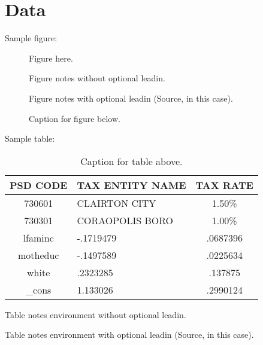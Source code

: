 \section{Data}
\label{sec:data}

Sample figure:

\begin{figure}
Figure here.

\caption{Caption for figure below.}
\begin{figurenotes}
Figure notes without optional leadin.
\end{figurenotes}
\begin{figurenotes}[Source]
Figure notes with optional leadin (Source, in this case).
\end{figurenotes}
\end{figure}

Sample table:

\begin{table}[t]
  \caption{Caption for table above.}

  \begin{tabular}{| c | l | c |}
    \hline
    \textbf{PSD CODE} & \textbf{TAX ENTITY NAME} & \textbf{TAX RATE} \\
    \hline
    730601 & CLAIRTON CITY & 1.50\% \\
    \hline
    730301 & CORAOPOLIS BORO & 1.00\% \\
    \hline
    lfaminc  & -.1719479 & .0687396 \\\hline
    motheduc & -.1497589 & .0225634 \\\hline
    white    & .2323285  & .137875  \\\hline
    \_cons     & 1.133026  & .2990124 \\\hline
 
  \end{tabular}

  \begin{tablenotes}
    Table notes environment without optional leadin.
  \end{tablenotes}

  \begin{tablenotes}[Source]
    Table notes environment with optional leadin (Source, in this case).
  \end{tablenotes}

\end{table}
